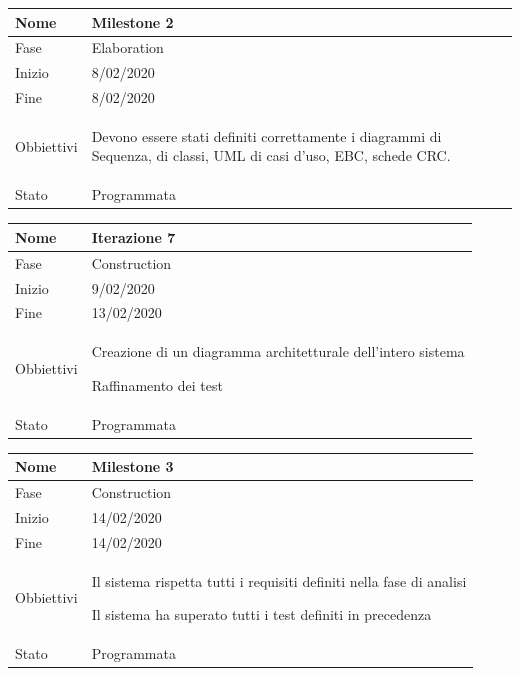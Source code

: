 \begin{center}
\begin{tabular}{ |p{2cm}|p{10cm}|  }
\hline
Nome & Milestone 2\\\hline
Fase & Elaboration \\\hline
Inizio & 8/02/2020 \\\hline
Fine &  8/02/2020 \\\hline
Obbiettivi & 
	\begin{compactitem}
		\item Devono essere stati definiti correttamente i diagrammi di Sequenza, di classi, UML di casi d'uso, EBC, schede CRC.
	\end{compactitem}\\\hline
Stato &  Programmata \\\hline
\end{tabular}
\label{table:milestone2}\newline

\begin{tabular}{ |p{2cm}|p{10cm}|  }
\hline
Nome & Iterazione 7 \\\hline
Fase & Construction \\\hline
Inizio & 9/02/2020 \\\hline
Fine &  13/02/2020  \\\hline
Obbiettivi & 
	\begin{compactitem}
		\item Creazione di un diagramma architetturale dell'intero sistema
		\item Raffinamento dei test
	\end{compactitem}\\\hline
Stato &  Programmata \\\hline
\end{tabular}
\label{table:7}\newline

\begin{tabular}{ |p{2cm}|p{10cm}|  }
\hline
Nome & Milestone 3\\\hline
Fase & Construction \\\hline
Inizio & 14/02/2020 \\\hline
Fine &  14/02/2020 \\\hline
Obbiettivi & 
	\begin{compactitem}
		\item Il sistema rispetta tutti i requisiti definiti nella fase di analisi
		\item Il sistema ha superato tutti i test definiti in precedenza
	\end{compactitem}\\\hline
Stato &  Programmata \\\hline
\end{tabular}
\label{table:milestone3}\newline


\end{center}
